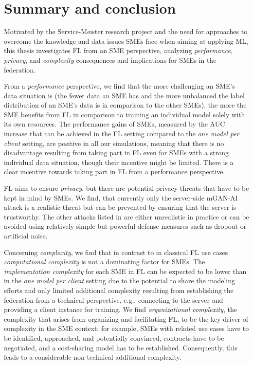 \section{Summary and conclusion\label{sec:summary}}
Motivated by the Service-Meister research project and the need for approaches to overcome the knowledge and data issues SMEs face when aiming at applying ML, this thesis investigates FL from an SME perspective, analyzing \emph{performance}, \emph{privacy}, and \emph{complexity} consequences and implications for SMEs in the federation.

From a \emph{performance} perspective, we find that the more challenging an SME's data situation is (the fewer data an SME has and the more unbalanced the label distribution of an SME's data is in comparison to the other SMEs), the more the SME benefits from FL in comparison to training an individual model solely with its own resources.
The performance gains of SMEs, measured by the AUC increase that can be achieved in the FL setting compared to the \emph{one model per client} setting, are positive in all our simulations, meaning that there is no disadvantage resulting from taking part in FL even for SMEs with a strong individual data situation, though their incentive might be limited. There is a clear incentive towards taking part in FL from a performance perspective.

FL aims to ensure \emph{privacy}, but there are potential privacy threats that have to be kept in mind by SMEs. We find, that currently only the server-side mGAN-AI \citep{wang2019mGANAI} attack is a realistic threat but can be prevented by ensuring that the server is trustworthy. The other attacks listed in \citet{enthoven2021overview} are either unrealistic in practice or can be avoided using relatively simple but powerful defense measures such as dropout or artificial noise.

Concerning \emph{complexity}, we find that in contrast to in classical FL use cases \emph{computational complexity} is not a dominating factor for SMEs. The \emph{implementation complexity} for each SME in FL can be expected to be lower than in the \emph{one model per client} setting due to the potential to share the modeling efforts and only limited additional complexity resulting from establishing the federation from a technical perspective, e.g., connecting to the server and providing a client instance for training. We find \emph{organizational complexity}, the complexity that arises from organizing and facilitating FL, to be the key driver of complexity in the SME context: for example, SMEs with related use cases have to be identified, approached, and potentially convinced, contracts have to be negotiated, and a cost-sharing model has to be established. Consequently, this leads to a considerable non-technical additional complexity.

